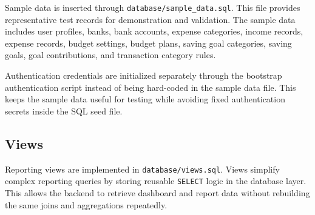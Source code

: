 ﻿\documentclass{article}
\begin{document}
Sample data is inserted through \texttt{database/sample\_data.sql}. This file provides 
representative test records for demonstration and validation. The sample data includes user 
profiles, banks, bank accounts, expense categories, income records, expense records, budget 
settings, budget plans, saving goal categories, saving goals, goal contributions, and 
transaction category rules.

Authentication credentials are initialized separately through the bootstrap authentication 
script instead of being hard-coded in the sample data file. This keeps the sample data useful 
for testing while avoiding fixed authentication secrets inside the SQL seed file.

\subsection{Views}

Reporting views are implemented in \texttt{database/views.sql}. Views simplify complex 
reporting queries by storing reusable \texttt{SELECT} logic in the database layer. This allows 
the backend to retrieve dashboard and report data without rebuilding the same joins and 
aggregations repeatedly.

\footnotesize
\renewcommand{\arraystretch}{1.15}
\end{document}
